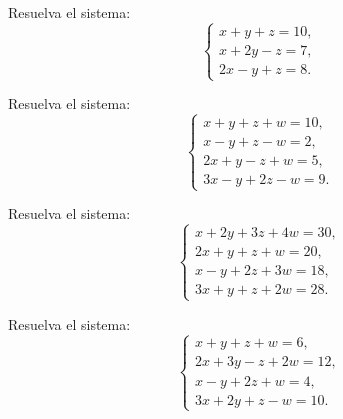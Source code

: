 \begin{ejercicio}
Resuelva el sistema:
\[
\begin{cases}
x + y + z = 10,\\
x + 2y - z = 7,\\
2x - y + z = 8.
\end{cases}
\]
\end{ejercicio}


\begin{ejercicio}
Resuelva el sistema:
\[
\begin{cases}
x + y + z + w = 10,\\
x - y + z - w = 2,\\
2x + y - z + w = 5,\\
3x - y + 2z - w = 9.
\end{cases}
\]
\end{ejercicio}

\begin{ejercicio}
Resuelva el sistema:
\[
\begin{cases}
x + 2y + 3z + 4w = 30,\\
2x + y + z + w = 20,\\
x - y + 2z + 3w = 18,\\
3x + y + z + 2w = 28.
\end{cases}
\]
\end{ejercicio}
\muestraSolucion{
\[
\boxed{x=6,\; y=2,\; z=4,\; w=2.}
\]
}

\begin{ejercicio}
Resuelva el sistema:
\[
\begin{cases}
x + y + z + w = 6,\\
2x + 3y - z + 2w = 12,\\
x - y + 2z + w = 4,\\
3x + 2y + z - w = 10.
\end{cases}
\]
\end{ejercicio}
\muestraSolucion{
\[
\boxed{x=\tfrac{29}{10},\; y=\tfrac{6}{5},\; z=\tfrac{2}{5},\; w=\tfrac{3}{2}.}
\]
}

